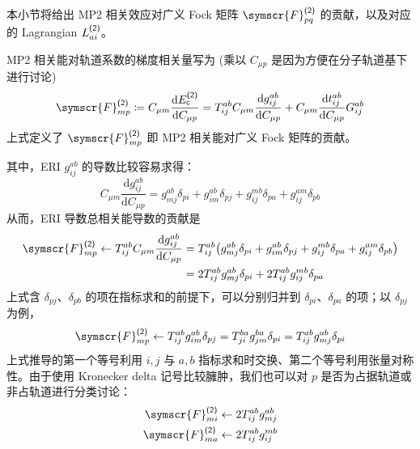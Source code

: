 本小节将给出 MP2 相关效应对广义 Fock 矩阵 $\symscr{F}_{pq}^\textmt{(2)}$ 的贡献，以及对应的 Lagrangian $L_{ai}^{\textsf{(2)}}$。

MP2 相关能对轨道系数的梯度相关量写为 (乘以 $C_{\mu p}$ 是因为方便在分子轨道基下进行讨论)
\begin{equation}
    \label{eq.3.def-fock-cmp2}
    \symscr{F}_{mp}^\textmt{(2)} \coloneq C_{\mu m} \frac{\mathrm{d} E_\textmt{c}^\textmt{(2)}}{\mathrm{d} C_{\mu p}} = T_{ij}^{ab} C_{\mu m} \frac{\mathrm{d} g_{ij}^{ab}}{\mathrm{d} C_{\mu p}} + C_{\mu m} \frac{\mathrm{d} t_{ij}^{ab}}{\mathrm{d} C_{\mu p}} G_{ij}^{ab}
\end{equation}
上式定义了 $\symscr{F}_{mp}^\textmt{(2)}$ 即 MP2 相关能对广义 Fock 矩阵的贡献。

其中，ERI $g_{ij}^{ab}$ 的导数比较容易求得：
\begin{equation}
    C_{\mu m} \frac{\mathrm{d} g_{ij}^{ab}}{\mathrm{d} C_{\mu p}} = g_{mj}^{ab} \delta_{pi} + g_{im}^{ab} \delta_{pj} + g_{ij}^{mb} \delta_{pa} + g_{ij}^{am} \delta_{pb}
\end{equation}
从而，ERI 导数总相关能导数的贡献是
\begin{align}
    \symscr{F}_{mp}^\textmt{(2)} \leftarrow T_{ij}^{ab} C_{\mu m} \frac{\mathrm{d} g_{ij}^{ab}}{\mathrm{d} C_{\mu p}} &= T_{ij}^{ab} \big( g_{mj}^{ab} \delta_{pi} + g_{im}^{ab} \delta_{pj} + g_{ij}^{mb} \delta_{pa} + g_{ij}^{am} \delta_{pb} \big) \notag\\
    &= 2 T_{ij}^{ab} g_{mj}^{ab} \delta_{pi} + 2 T_{ij}^{ab} g_{ij}^{mb} \delta_{pa}
\end{align}
上式含 $\delta_{pj}$、$\delta_{pb}$ 的项在指标求和的前提下，可以分别归并到 $\delta_{pi}$、$\delta_{pa}$ 的项；以 $\delta_{pj}$ 为例，
\begin{align*}
    \symscr{F}_{mp}^\textmt{(2)} \leftarrow T_{ij}^{ab} g_{im}^{ab} \delta_{pj} = T_{ji}^{ba} g_{jm}^{ba} \delta_{pi} = T_{ij}^{ab} g_{mj}^{ab} \delta_{pi}
\end{align*}
上式推导的第一个等号利用 $i, j$ 与 $a, b$ 指标求和时交换、第二个等号利用张量对称性。由于使用 Kronecker delta 记号比较臃肿，我们也可以对 $p$ 是否为占据轨道或非占轨道进行分类讨论：
\begin{align}
    \label{eq.3.fock-cmp2-part1-mi}
    \symscr{F}_{mi}^\textmt{(2)} &\leftarrow 2 T_{ij}^{ab} g_{mj}^{ab} \\
    \label{eq.3.fock-cmp2-part1-ma}
    \symscr{F}_{ma}^\textmt{(2)} &\leftarrow 2 T_{ij}^{ab} g_{ij}^{mb}
\end{align}

